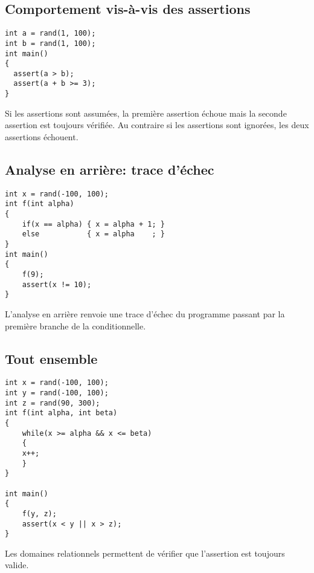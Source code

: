\documentclass{article}
\begin{document}
\subsection{Comportement vis-à-vis des assertions}
\begin{lstlisting}[frame=single]
int a = rand(1, 100);
int b = rand(1, 100);
int main()
{
  assert(a > b);
  assert(a + b >= 3);
}
\end{lstlisting}

Si les assertions sont assumées, la première assertion échoue mais la
seconde assertion est toujours vérifiée. Au contraire si les
assertions sont ignorées, les deux assertions échouent.

\subsection{Analyse en arrière: trace d'échec}
\begin{lstlisting}[frame=single]
int x = rand(-100, 100);
int f(int alpha)
{
    if(x == alpha) { x = alpha + 1; }
    else           { x = alpha    ; }
}
int main()
{
    f(9);
    assert(x != 10);
}
\end{lstlisting}

L'analyse en arrière renvoie une trace d'échec du programme passant
par la première branche de la conditionnelle.




\subsection{Tout ensemble}
\begin{lstlisting}[frame=single]
int x = rand(-100, 100);
int y = rand(-100, 100);
int z = rand(90, 300);
int f(int alpha, int beta)
{
    while(x >= alpha && x <= beta)
    {
	x++;
    }
}

int main()
{
    f(y, z);
    assert(x < y || x > z);
}
\end{lstlisting}
Les domaines relationnels permettent de vérifier que l'assertion est
toujours valide.
\end{document}
